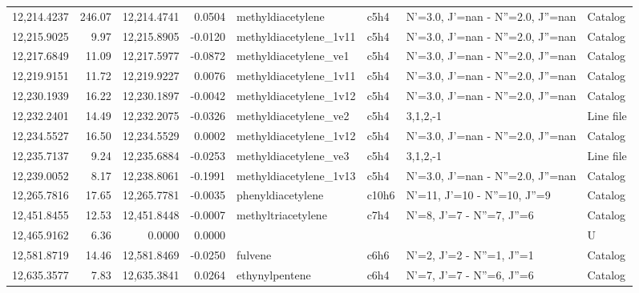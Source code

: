 \begin{longtable}{rrrrllll}
12,214.4237 &    246.07 &       12,214.4741 &    0.0504 &           methyldiacetylene &    c5h4 &    N'=3.0, J'=nan - N''=2.0, J''=nan &    Catalog \\
12,215.9025 &      9.97 &       12,215.8905 &   -0.0120 &      methyldiacetylene_1v11 &    c5h4 &    N'=3.0, J'=nan - N''=2.0, J''=nan &    Catalog \\
12,217.6849 &     11.09 &       12,217.5977 &   -0.0872 &       methyldiacetylene_ve1 &    c5h4 &    N'=3.0, J'=nan - N''=2.0, J''=nan &    Catalog \\
12,219.9151 &     11.72 &       12,219.9227 &    0.0076 &      methyldiacetylene_1v11 &    c5h4 &    N'=3.0, J'=nan - N''=2.0, J''=nan &    Catalog \\
12,230.1939 &     16.22 &       12,230.1897 &   -0.0042 &      methyldiacetylene_1v12 &    c5h4 &    N'=3.0, J'=nan - N''=2.0, J''=nan &    Catalog \\
12,232.2401 &     14.49 &       12,232.2075 &   -0.0326 &       methyldiacetylene_ve2 &    c5h4 &                             3,1,2,-1 &  Line file \\
12,234.5527 &     16.50 &       12,234.5529 &    0.0002 &      methyldiacetylene_1v12 &    c5h4 &    N'=3.0, J'=nan - N''=2.0, J''=nan &    Catalog \\
12,235.7137 &      9.24 &       12,235.6884 &   -0.0253 &       methyldiacetylene_ve3 &    c5h4 &                             3,1,2,-1 &  Line file \\
12,239.0052 &      8.17 &       12,238.8061 &   -0.1991 &      methyldiacetylene_1v13 &    c5h4 &    N'=3.0, J'=nan - N''=2.0, J''=nan &    Catalog \\
12,265.7816 &     17.65 &       12,265.7781 &   -0.0035 &           phenyldiacetylene &   c10h6 &         N'=11, J'=10 - N''=10, J''=9 &    Catalog \\
12,451.8455 &     12.53 &       12,451.8448 &   -0.0007 &          methyltriacetylene &    c7h4 &            N'=8, J'=7 - N''=7, J''=6 &    Catalog \\
12,465.9162 &      6.36 &            0.0000 &    0.0000 &                             &         &                                      &          U \\
12,581.8719 &     14.46 &       12,581.8469 &   -0.0250 &                     fulvene &    c6h6 &            N'=2, J'=2 - N''=1, J''=1 &    Catalog \\
12,635.3577 &      7.83 &       12,635.3841 &    0.0264 &              ethynylpentene &    c6h4 &            N'=7, J'=7 - N''=6, J''=6 &    Catalog \\

\end{longtable}
